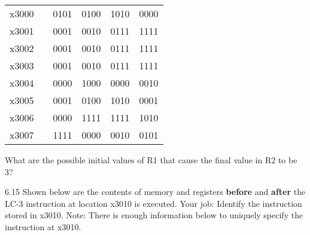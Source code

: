 \documentclass{patt}
\begin{document}
\begin{exercises}
\begin{inlinetable}
\ttfamily\color{seventyblack}
\vspace{-6pt}
\begin{tabular}{@{}llllll@{}}
x3000 &  &   0101 & 0100 & 1010 & 0000\\
x3001 &  &  0001 & 0010 & 0111 & 1111\\
x3002 &  &   0001 & 0010 & 0111 & 1111\\
x3003  &  &   0001 & 0010 & 0111 & 1111\\
x3004 &  &    0000 & 1000 & 0000 & 0010\\
x3005  &  &   0001 & 0100 & 1010 & 0001\\
x3006   &  &  0000 & 1111 & 1111 & 1010\\
x3007 &  &    1111 & 0000 & 0010 & 0101\\
\end{tabular}
\vspace{-6pt}
\end{inlinetable}

What are the possible initial values of R1 that
cause the final value in R2 to be 3?



\item[6.15] Shown below are the contents of memory and registers {\bf
    before} and {\bf after} the LC-3 instruction at location x3010 is
  executed. Your job: Identify the instruction stored in x3010. Note:
  There is enough information below to uniquely specify the
  instruction at x3010.


\end{exercises}
\end{document}
